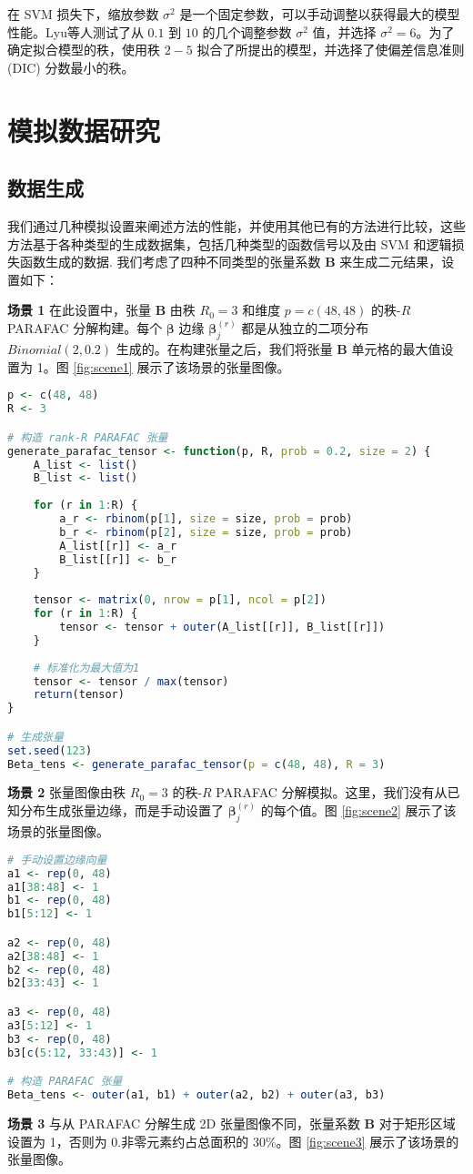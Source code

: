 \documentclass[AutoFakeBold]{LZUThesis}
\newcommand{\scite}[1]{\textsuperscript{\cite{#1}}}
\begin{document}
在 SVM 损失下，缩放参数 $\sigma^2$ 是一个固定参数，可以手动调整以获得最大的模型性能。Lyu等人\scite{lyu2024bayesian}测试了从 $0.1$ 到 $10$ 的几个调整参数 $\sigma^2$ 值，并选择 $\sigma^2 = 6$。为了确定拟合模型的秩，使用秩 $2-5$ 拟合了所提出的模型，并选择了使偏差信息准则 (DIC) 分数最小的秩。

\chapter{模拟数据研究}
\section{数据生成}
我们通过几种模拟设置来阐述方法的性能，并使用其他已有的方法进行比较，这些方法基于各种类型的生成数据集，包括几种类型的函数信号以及由 SVM 和逻辑损失函数生成的数据. 我们考虑了四种不同类型的张量系数 $\boldsymbol{B}$ 来生成二元结果，设置如下：

\textbf{场景 1} 在此设置中，张量 $\boldsymbol{B}$ 由秩 $R_0 = 3$ 和维度 $p = c(48, 48)$ 的秩-$R$ PARAFAC 分解构建。每个 $\boldsymbol{\beta}$ 边缘 $\boldsymbol{\beta}_j^{(r)}$ 都是从独立的二项分布 $Binomial(2, 0.2)$ 生成的。在构建张量之后，我们将张量 $\boldsymbol{B}$ 单元格的最大值设置为 1。图 \ref{fig:scene1} 展示了该场景的张量图像。
\begin{lstlisting}[language=R]
p <- c(48, 48)
R <- 3

# 构造 rank-R PARAFAC 张量
generate_parafac_tensor <- function(p, R, prob = 0.2, size = 2) {
	A_list <- list()
	B_list <- list()
	
	for (r in 1:R) {
		a_r <- rbinom(p[1], size = size, prob = prob)
		b_r <- rbinom(p[2], size = size, prob = prob)
		A_list[[r]] <- a_r
		B_list[[r]] <- b_r
	}
	
	tensor <- matrix(0, nrow = p[1], ncol = p[2])
	for (r in 1:R) {
		tensor <- tensor + outer(A_list[[r]], B_list[[r]])
	}
	
	# 标准化为最大值为1
	tensor <- tensor / max(tensor)
	return(tensor)
}

# 生成张量
set.seed(123)
Beta_tens <- generate_parafac_tensor(p = c(48, 48), R = 3)
\end{lstlisting}

\textbf{场景 2} 张量图像由秩 $R_0 = 3$ 的秩-$R$ PARAFAC 分解模拟。这里，我们没有从已知分布生成张量边缘，而是手动设置了 $\boldsymbol{\beta}_j^{(r)}$ 的每个值。图 \ref{fig:scene2} 展示了该场景的张量图像。

\begin{lstlisting}[language=R]
# 手动设置边缘向量
a1 <- rep(0, 48)
a1[38:48] <- 1
b1 <- rep(0, 48)
b1[5:12] <- 1

a2 <- rep(0, 48)
a2[38:48] <- 1
b2 <- rep(0, 48)
b2[33:43] <- 1

a3 <- rep(0, 48)
a3[5:12] <- 1
b3 <- rep(0, 48)
b3[c(5:12, 33:43)] <- 1

# 构造 PARAFAC 张量
Beta_tens <- outer(a1, b1) + outer(a2, b2) + outer(a3, b3)

\end{lstlisting}
\textbf{场景 3} 与从 PARAFAC 分解生成 2D 张量图像不同，张量系数 $\boldsymbol{B}$ 对于矩形区域设置为 1，否则为 0.非零元素约占总面积的 30\%。图 \ref{fig:scene3} 展示了该场景的张量图像。
\end{document}
